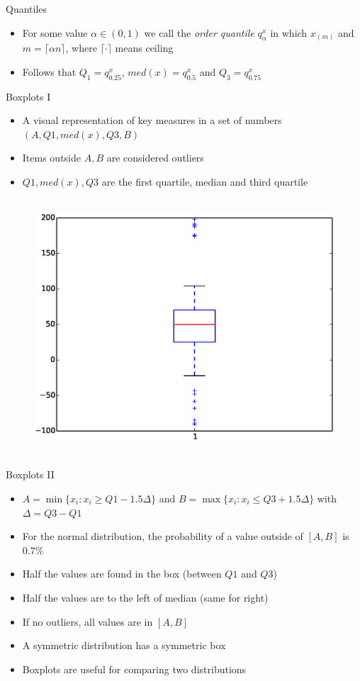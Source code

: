\documentclass{beamer}
\begin{document}
\begin{frame}{Quantiles} 
\begin{itemize} 
 \item For some value $\alpha \in (0, 1)$ we call the \emph{order quantile} $q_\alpha^x$ in which $x_{(m)}$ and $m = \lceil \alpha n \rceil$, where $\lceil \cdot \rceil$ means ceiling
 \item Follows that $Q_1 = q_{0.25}^x$, $med(x) = q_{0.5}^x$ and $Q_3 = q_{0.75}^x$
\end{itemize}
\end{frame}

\begin{frame}{Boxplots I} 
\begin{itemize} 
 \item A visual representation of key measures in a set of numbers $(A, Q1, med(x), Q3, B)$ 
 \item Items outside $A, B$ are considered outliers 
 \item $Q1, med(x), Q3$ are the first quartile, median and third quartile 
\end{itemize}
  \begin{figure}[htp]
\mbox{
\includegraphics[width=0.5\linewidth]{BoxPlot.eps}
}
\end{figure} 
\end{frame}

\begin{frame}{Boxplots II} 
\begin{itemize} 
 \item $A = \min \{x_i : x_i \geq Q1 - 1.5\Delta \}$ and $B = \max\{x_i : x_i \leq Q3 + 1.5\Delta \}$ with $\Delta = Q3 - Q1$
 \item For the normal distribution, the probability of a value outside of $[A, B]$ is $0.7\%$
 \item Half the values are found in the box (between $Q1$ and $Q3$) 
 \item Half the values are to the left of median (same for right)
 \item If no outliers, all values are in $[A, B]$
 \item A symmetric distribution has a symmetric box
 \item Boxplots are useful for comparing two distributions 
\end{itemize}
\end{frame}
\end{document}
